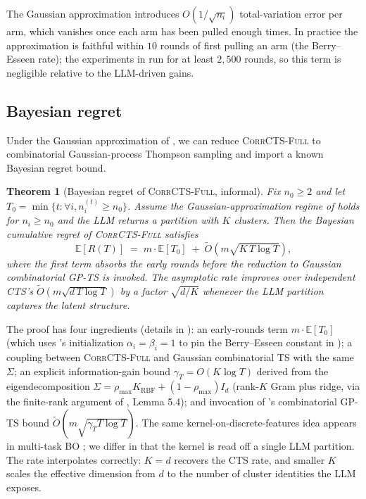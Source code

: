 \documentclass{article}
\theoremstyle{plain}
\newtheorem{theorem}{Theorem}[section]
\theoremstyle{definition}
\theoremstyle{remark}
\newcommand{\E}{\mathbb{E}}
\newcommand{\CorrFull}{\textsc{CorrCTS-Full}}
\begin{document}
The Gaussian approximation introduces $O(1/\sqrt{n_i})$ total-variation error per arm, which vanishes once each arm has been pulled enough times.
In practice the approximation is faithful within $10$ rounds of first pulling an arm (the Berry--Esseen rate); the experiments in  run for at least $2{,}500$ rounds, so this term is negligible relative to the LLM-driven gains.

\subsection{Bayesian regret}\label{sec:bayesregret}

Under the Gaussian approximation of , we can reduce \CorrFull{} to combinatorial Gaussian-process Thompson sampling and import a known Bayesian regret bound.

\begin{theorem}[Bayesian regret of \CorrFull{}, informal]\label{thm:bayes}
Fix $n_0 \geq 2$ and let $T_0 = \min\{t : \forall i, n_i^{(t)} \geq n_0\}$.
Assume the Gaussian-approximation regime of  holds for $n_i \geq n_0$ and the LLM returns a partition with $K$ clusters.
Then the Bayesian cumulative regret of \CorrFull{} satisfies
\[
\E[R(T)] \;=\; m \cdot \E[T_0] \;+\; \tilde O\!\left(m \sqrt{K\, T \log T}\right),
\]
where the first term absorbs the early rounds before the reduction to Gaussian combinatorial GP-TS is invoked.
The asymptotic rate improves over independent CTS's $\tilde O(m\sqrt{d\, T \log T})$ by a factor $\sqrt{d/K}$ whenever the LLM partition captures the latent structure.
\end{theorem}

The proof has four ingredients (details in ): an early-rounds term $m \cdot \E[T_0]$ (which uses 's initialization $\alpha_i = \beta_i = 1$ to pin the Berry--Esseen constant in ); a coupling between \CorrFull{} and Gaussian combinatorial TS with the same $\Sigma$; an explicit information-gain bound $\gamma_T = O(K \log T)$ derived from the eigendecomposition $\Sigma = \rho_{\max} K_{\mathrm{RBF}} + (1 - \rho_{\max}) I_d$ (rank-$K$ Gram plus ridge, via the finite-rank argument of \citealp{srinivas2010gpucb}, Lemma 5.4); and invocation of \citet{sandberg2025bayesian}'s combinatorial GP-TS bound $\tilde O(m\sqrt{\gamma_T T \log T})$.
The same kernel-on-discrete-features idea appears in multi-task BO \citep{swersky2013multitask}; we differ in that the kernel is read off a single LLM partition.
The rate interpolates correctly: $K = d$ recovers the CTS rate, and smaller $K$ scales the effective dimension from $d$ to the number of cluster identities the LLM exposes.
\end{document}
